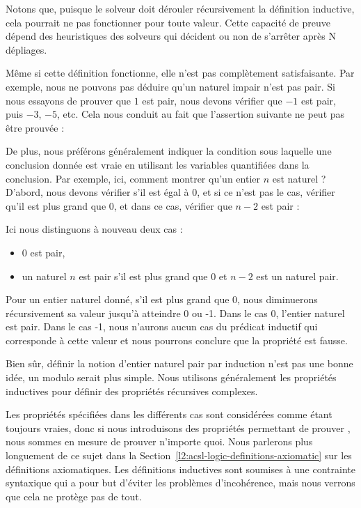 Notons que, puisque le solveur doit dérouler récursivement la définition
inductive, cela pourrait ne pas fonctionner pour toute valeur. Cette
capacité de preuve dépend des heuristiques des solveurs qui décident ou non de
s'arrêter après N dépliages.

Même si cette définition fonctionne, elle n'est pas complètement satisfaisante.
Par exemple, nous ne pouvons pas déduire qu'un naturel impair n'est pas pair. Si
nous essayons de prouver que $1$ est pair, nous devons vérifier que $-1$ est
pair, puis $-3$, $-5$, etc. Cela nous conduit au fait que l'assertion suivante
ne peut pas être prouvée :




De plus, nous préférons généralement indiquer la condition sous laquelle une
conclusion donnée est vraie en utilisant les variables quantifiées dans la
conclusion. Par exemple, ici, comment montrer qu'un entier $n$ est naturel ?
D'abord, nous devons vérifier s'il est égal à 0, et si ce n'est pas le cas,
vérifier qu'il est plus grand que 0, et dans ce cas, vérifier que $n-2$ est
pair :




Ici nous distinguons à nouveau deux cas :

\begin{itemize}
\item 0 est pair,
\item un naturel $n$ est pair s'il est plus grand que $0$ et $n-2$ est un
      naturel pair.
\end{itemize}


Pour un entier naturel donné, s'il est plus grand que 0, nous diminuerons
récursivement sa valeur jusqu'à atteindre 0 ou -1. Dans le cas 0, l'entier
naturel est pair. Dans le cas -1, nous n'aurons aucun cas du prédicat inductif
qui corresponde à cette valeur et nous pourrons conclure que la propriété est
fausse.




Bien sûr, définir la notion d'entier naturel pair par induction n'est pas une
bonne idée, un modulo serait plus simple. Nous utilisons généralement les
propriétés inductives pour définir des propriétés récursives complexes.




Les propriétés spécifiées dans les différents cas sont considérées comme étant
toujours vraies, donc si nous introduisons des propriétés permettant de prouver
, nous sommes en mesure de prouver n'importe quoi. Nous
parlerons plus longuement de ce sujet dans la
Section~\ref{l2:acsl-logic-definitions-axiomatic} sur les définitions
axiomatiques. Les définitions inductives sont soumises à une contrainte syntaxique
qui a pour but d'éviter les problèmes d'incohérence, mais nous verrons que
cela ne protège pas de tout.


